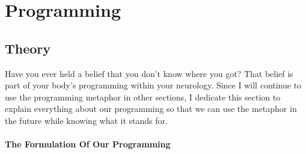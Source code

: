\documentclass[a4paper, 12pt]{article}
\begin{document}
\section{Programming}
\subsection{Theory}
Have you ever held a belief that you don't know where you got? That belief is part of your body's programming within your neurology. Since I will continue to use the programming metaphor in other sections, I dedicate this section to explain everything about our programming so that we can use the metaphor in the future while knowing what it stands for.
\paragraph{The Formulation Of Our Programming}
\end{document}
